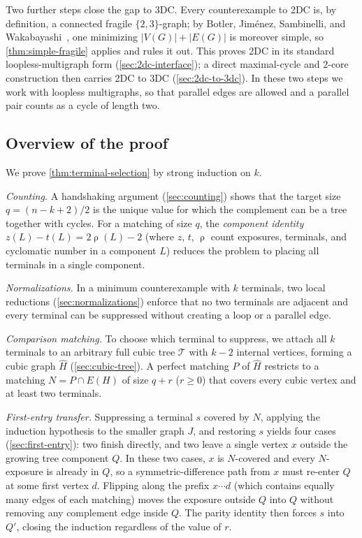 \documentclass[a4paper,11pt]{article}
\newcommand{\abs}[1]{\left\lvert#1\right\rvert}
\DeclareMathOperator{\cyc}{\rho}               %
\numberwithin{equation}{section}
\begin{document}
Two further steps close the gap to 3DC. Every counterexample to 2DC is, by
definition, a connected fragile $\{2,3\}$-graph; by Botler, Jim\'enez, Sambinelli,
and Wakabayashi~\cite{BotlerJimenezSambinelliWakabayashi2024}, one minimizing
$\abs{V(G)}+\abs{E(G)}$ is moreover simple, so \cref{thm:simple-fragile} applies
and rules it out. This proves 2DC in its standard loopless-multigraph form
(\cref{sec:2dc-interface}); a direct maximal-cycle and $2$-core construction then
carries 2DC to 3DC (\cref{sec:2dc-to-3dc}). In these two steps we
work with loopless multigraphs, so that parallel edges are allowed and a
parallel pair counts as a cycle of length two.

\subsection*{Overview of the proof}

We prove \cref{thm:terminal-selection} by strong induction on $k$.

\emph{Counting.}  A handshaking argument (\cref{sec:counting}) shows that the
target size $q=(n-k+2)/2$ is the unique value for which the complement can be a
tree together with cycles.  For a matching of size $q$, the \emph{component
identity} $z(L)-t(L)=2\cyc(L)-2$ (where $z$, $t$, $\cyc$ count exposures,
terminals, and cyclomatic number in a component $L$) reduces the problem to placing all
terminals in a single component.

\emph{Normalizations.}  In a minimum counterexample with $k$ terminals, two
local reductions (\cref{sec:normalizations}) enforce that no two terminals are
adjacent and every terminal can be suppressed without creating a loop or a
parallel edge.

\emph{Comparison matching.}  To choose which terminal to suppress, we attach all
$k$ terminals to an arbitrary full cubic tree $\mathcal T$ with $k-2$ internal
vertices, forming a cubic graph $\widehat H$ (\cref{sec:cubic-tree}).  A
perfect matching $P$ of $\widehat H$ restricts to a matching $N=P\cap E(H)$ of
size $q+r$ ($r\ge 0$) that covers every cubic vertex and at least two terminals.

\emph{First-entry transfer.}  Suppressing a terminal $s$ covered by $N$, applying
the induction hypothesis to the smaller graph $J$, and restoring $s$ yields four
cases (\cref{sec:first-entry}): two finish directly, and two leave a single
vertex $x$ outside the growing tree component $Q$.  In these two cases, $x$ is
$N$-covered and every $N$-exposure is already in $Q$, so a symmetric-difference
path from $x$ must re-enter $Q$ at some first vertex $d$.  Flipping along the
prefix $x\cdots d$ (which contains equally many edges of each matching)
moves the exposure outside $Q$ into $Q$ without removing any complement edge
inside $Q$.
The parity identity then forces $s$ into $Q'$, closing the induction regardless
of the value of $r$.
\end{document}

